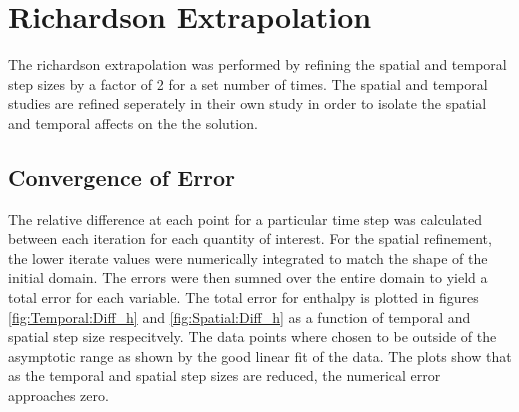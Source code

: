 \documentclass{mc2015}
\begin{document}
%    
%    
%    
%    

\section{Richardson Extrapolation}

The richardson extrapolation was performed by  refining the spatial and temporal
step sizes by a factor of 2 for a set number of times. The spatial and temporal
studies are refined seperately in their own study in order to isolate the
spatial and temporal affects on the the solution. 


\subsection{Convergence of Error}

The relative difference at each point for a particular time step was calculated
between each iteration for each quantity of interest. For the spatial
refinement, the lower iterate values were numerically integrated to match the
shape of the initial domain. The errors were then sumned over the entire domain
to yield a total error for each variable. The total error for enthalpy is
plotted in figures \ref{fig:Temporal:Diff_h} and \ref{fig:Spatial:Diff_h} as a
function of temporal and spatial step size respecitvely.  The data points where
chosen to be outside of the asymptotic range as shown by the good linear fit of
the data. The plots show that as the temporal and spatial step sizes are
reduced, the numerical error approaches zero. 
\end{document}
